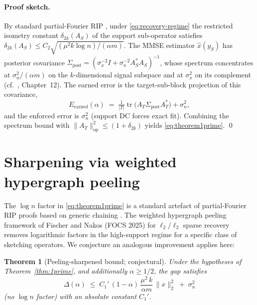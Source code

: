 \documentclass[11pt]{article}
\newtheorem{theorem}{Theorem}
\theoremstyle{remark}
\begin{document}
\paragraph*{Proof sketch.}
By standard partial-Fourier RIP
\cite{CandesTao2006, RudelsonVershynin2008, Rauhut2010}, under
\eqref{eq:recovery-regime} the restricted isometry constant
$\delta_{2k}(A_S)$ of the support sub-operator satisfies
$\delta_{2k}(A_S) \leq C_2 \sqrt{(\mu^2 k \log n)/(\alpha m)}$. The MMSE
estimator $\hat{x}(y_S)$ has posterior covariance
$\Sigma_{\mathrm{post}} = (\sigma_x^{-2} I + \sigma_n^{-2} A_S^{\!*} A_S)^{-1}$,
whose spectrum concentrates at $\sigma_n^2/(\alpha m)$ on the
$k$-dimensional signal subspace and at $\sigma_x^2$ on its complement
(cf.\ \cite{FoucartRauhut2013}, Chapter~12). The earned error is the
target-sub-block projection of this covariance,
\begin{equation*}
    E_{\mathrm{earned}}(\alpha) \;=\; \tfrac{1}{|T|}\operatorname{tr}\!\big(A_T \Sigma_{\mathrm{post}} A_T^{\!*}\big) + \sigma_n^2,
\end{equation*}
and the enforced error is $\sigma_n^2$ (support DC forces exact fit).
Combining the spectrum bound with $\|A_T\|_{\mathrm{op}}^2 \leq
(1+\delta_{2k})$ yields \eqref{eq:theorem1prime}. \qed

\section*{Sharpening via weighted hypergraph peeling}

The $\log n$ factor in \eqref{eq:theorem1prime} is a standard artefact of
partial-Fourier RIP proofs based on generic chaining
\cite{RudelsonVershynin2008, FoucartRauhut2013}. The weighted hypergraph
peeling framework of Fischer and Nakos (FOCS 2025)
\cite{FischerNakos2025} for $\ell_2/\ell_2$ sparse recovery removes
logarithmic factors in the high-support regime for a specific class of
sketching operators. We conjecture an analogous improvement applies
here:

\begin{theorem}[Peeling-sharpened bound; conjectural]\label{thm:1primesharp}
Under the hypotheses of Theorem~\ref{thm:1prime}, and additionally
$\alpha \geq 1/2$, the gap satisfies
\begin{equation}
    \Delta(\alpha) \;\leq\; C_1'\, (1-\alpha)\,\frac{\mu^2\, k}{\alpha m}\,\|x\|_2^2 \;+\; \sigma_n^2
    \label{eq:sharp}
\end{equation}
(no $\log n$ factor) with an absolute constant $C_1'$.
\end{theorem}
\end{document}
